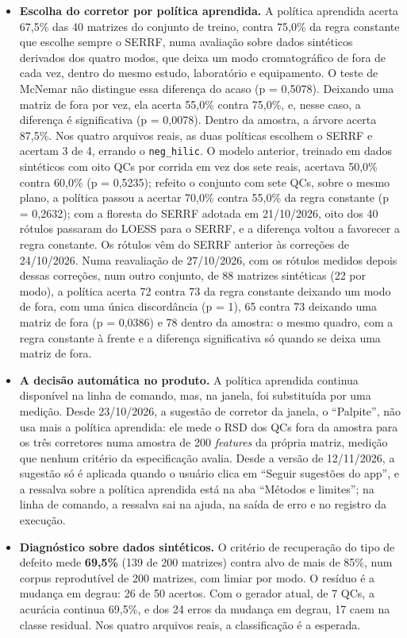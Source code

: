 \begin{itemize}
\item \textbf{Escolha do corretor por política aprendida.} A política aprendida acerta 67,5\% das 40 matrizes do conjunto de treino, contra 75,0\% da regra constante que escolhe sempre o SERRF, numa avaliação sobre dados sintéticos derivados dos quatro modos, que deixa um modo cromatográfico de fora de cada vez, dentro do mesmo estudo, laboratório e equipamento. O teste de McNemar não distingue essa diferença do acaso (p = 0,5078). Deixando uma matriz de fora por vez, ela acerta 55,0\% contra 75,0\%, e, nesse caso, a diferença é significativa (p = 0,0078). Dentro da amostra, a árvore acerta 87,5\%. Nos quatro arquivos reais, as duas políticas escolhem o SERRF e acertam 3 de 4, errando o \texttt{neg\_\allowbreak{}hilic}. O modelo anterior, treinado em dados sintéticos com oito QCs por corrida em vez dos sete reais, acertava 50,0\% contra 60,0\% (p = 0,5235); refeito o conjunto com sete QCs, sobre o mesmo plano, a política passou a acertar 70,0\% contra 55,0\% da regra constante (p = 0,2632); com a floresta do SERRF adotada em 21/10/2026, oito dos 40 rótulos passaram do LOESS para o SERRF, e a diferença voltou a favorecer a regra constante. Os rótulos vêm do SERRF anterior às correções de 24/10/2026. Numa reavaliação de 27/10/2026, com os rótulos medidos depois dessas correções, num outro conjunto, de 88 matrizes sintéticas (22 por modo), a política acerta 72 contra 73 da regra constante deixando um modo de fora, com uma única discordância (p = 1), 65 contra 73 deixando uma matriz de fora (p = 0,0386) e 78 dentro da amostra: o mesmo quadro, com a regra constante à frente e a diferença significativa só quando se deixa uma matriz de fora.
\item \textbf{A decisão automática no produto.} A política aprendida continua disponível na linha de comando, mas, na janela, foi substituída por uma medição. Desde 23/10/2026, a sugestão de corretor da janela, o ``Palpite'', não usa mais a política aprendida: ele mede o RSD dos QCs fora da amostra para os três corretores numa amostra de 200 \textit{features} da própria matriz, medição que nenhum critério da especificação avalia. Desde a versão de 12/11/2026, a sugestão só é aplicada quando o usuário clica em ``Seguir sugestões do app'', e a ressalva sobre a política aprendida está na aba ``Métodos e limites''; na linha de comando, a ressalva sai na ajuda, na saída de erro e no registro da execução.
\item \textbf{Diagnóstico sobre dados sintéticos.} O critério de recuperação do tipo de defeito mede \textbf{69,5\%} (139 de 200 matrizes) contra alvo de mais de 85\%, num corpus reprodutível de 200 matrizes, com limiar por modo. O resíduo é a mudança em degrau: 26 de 50 acertos. Com o gerador atual, de 7 QCs, a acurácia continua 69,5\%, e dos 24 erros da mudança em degrau, 17 caem na classe residual. Nos quatro arquivos reais, a classificação é a esperada.
\end{itemize}

